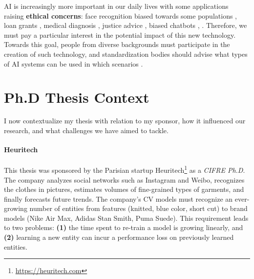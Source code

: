 \ac{AI} is increasingly more important in our daily lives with some applications raising
\textbf{ethical concerns}: face recognition biased towards some populations
\citep{grother2019facerecoethic}, loan grants \citep{anglekar2021loangrantml}, medical diagnosis
\citep{lazzazabal2020medicalbias}, justice advice \citep{russel2020justicefairness}, biased chatbots
\citep{sheng2019lmbias}, \etc. Therefore, we must pay a particular interest in the potential impact
of this new technology. Towards this goal, people from diverse backgrounds must participate in the
creation of such technology, and standardization bodies \citep{tommasi2021fairness} should advise
what types of \ac{AI} systems can be used in which scenarios \citep{gebru2019aiethichandbook}.

\section{Ph.D Thesis Context}

I now contextualize my thesis with relation to my sponsor, how it influenced our research, and what
challenges we have aimed to tackle.

\paragraph{Heuritech} This thesis was sponsored by the Parisian startup
Heuritech\footnote{\url{https://heuritech.com}} as a \textit{CIFRE Ph.D}. The company analyzes social
networks such as Instagram and Weibo, recognizes the clothes in pictures, estimates
volumes of fine-grained types of garments, and finally forecasts future trends. The company's
\acf{CV} models must recognize an ever-growing number of entities from features (\eg knitted, blue
color, short cut) to brand models (\eg Nike Air Max, Adidas Stan Smith, Puma Suede). This
requirement leads to two problems: \textbf{(1)} the time spent to re-train a model is growing
linearly, and \textbf{(2)} learning a new entity can incur a performance loss on previously learned
entities.


